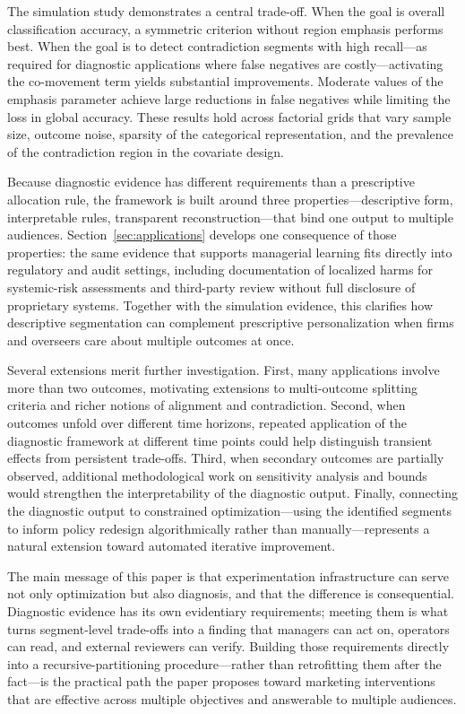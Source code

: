 \documentclass[11pt,letterpaper,english]{article}
\theoremstyle{definition}
\theoremstyle{definition}
\begin{document}
\begin{bibunit}
The simulation study demonstrates a central trade-off. When the goal is overall classification accuracy, a symmetric criterion without region emphasis performs best. When the goal is to detect contradiction segments with high recall---as required for diagnostic applications where false negatives are costly---activating the co-movement term yields substantial improvements. Moderate values of the emphasis parameter achieve large reductions in false negatives while limiting the loss in global accuracy. These results hold across factorial grids that vary sample size, outcome noise, sparsity of the categorical representation, and the prevalence of the contradiction region in the covariate design.

Because diagnostic evidence has different requirements than a prescriptive allocation rule, the framework is built around three properties---descriptive form, interpretable rules, transparent reconstruction---that bind one output to multiple audiences. Section~\ref{sec:applications} develops one consequence of those properties: the same evidence that supports managerial learning fits directly into regulatory and audit settings, including documentation of localized harms for systemic-risk assessments and third-party review without full disclosure of proprietary systems. Together with the simulation evidence, this clarifies how descriptive segmentation can complement prescriptive personalization when firms and overseers care about multiple outcomes at once.

Several extensions merit further investigation. First, many applications involve more than two outcomes, motivating extensions to multi-outcome splitting criteria and richer notions of alignment and contradiction. Second, when outcomes unfold over different time horizons, repeated application of the diagnostic framework at different time points could help distinguish transient effects from persistent trade-offs. Third, when secondary outcomes are partially observed, additional methodological work on sensitivity analysis and bounds would strengthen the interpretability of the diagnostic output. Finally, connecting the diagnostic output to constrained optimization---using the identified segments to inform policy redesign algorithmically rather than manually---represents a natural extension toward automated iterative improvement.

The main message of this paper is that experimentation infrastructure can serve not only optimization but also diagnosis, and that the difference is consequential. Diagnostic evidence has its own evidentiary requirements; meeting them is what turns segment-level trade-offs into a finding that managers can act on, operators can read, and external reviewers can verify. Building those requirements directly into a recursive-partitioning procedure---rather than retrofitting them after the fact---is the practical path the paper proposes toward marketing interventions that are effective across multiple objectives and answerable to multiple audiences.


\newpage
\renewcommand{\baselinestretch}{1.0} 
\putbib


\end{bibunit}
\end{document}
